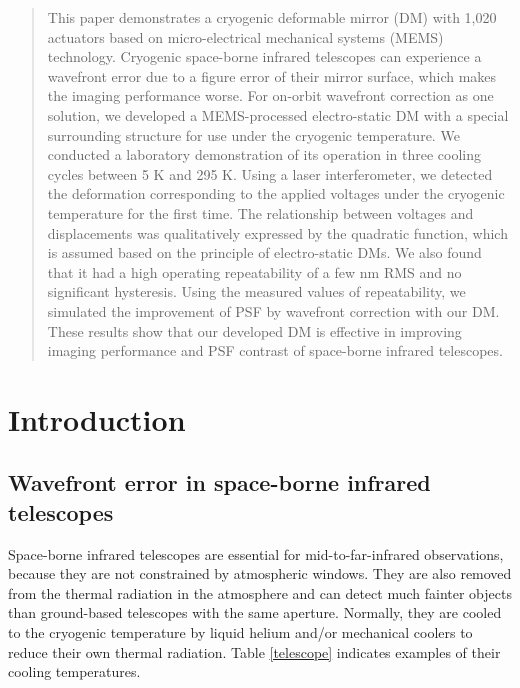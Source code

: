 \documentclass[a4paper]{article}
\begin{document}
\begin{titlepage}

\begin{abstract}

This paper demonstrates a cryogenic deformable mirror (DM) with 1,020 actuators based on micro-electrical mechanical systems (MEMS) technology. Cryogenic space-borne infrared telescopes can experience a wavefront error due to a figure error of their mirror surface, which makes the imaging performance worse. 
For on-orbit wavefront correction as one solution, we developed a MEMS-processed electro-static DM with a special surrounding structure for use under the cryogenic temperature. We conducted a laboratory demonstration of its operation in three cooling cycles between 5 K and 295 K. Using a laser interferometer, we detected the deformation corresponding to the applied voltages under the cryogenic temperature for the first time. The relationship between voltages and displacements was qualitatively expressed by the quadratic function, which is assumed based on the principle of electro-static DMs. We also found that it had a high operating repeatability of a few nm RMS and no significant hysteresis. 
Using the measured values of repeatability, we simulated the improvement of PSF by wavefront correction with our DM. These results show that our developed DM is effective in improving imaging performance and PSF contrast of space-borne infrared telescopes.
\end{abstract}
\end{titlepage}

\maketitle


\section{Introduction}

\subsection{Wavefront error in space-borne infrared telescopes}
Space-borne infrared telescopes are essential for mid-to-far-infrared observations, because they are not constrained by atmospheric windows. They are also removed from the thermal radiation in the atmosphere and can detect much fainter objects than ground-based telescopes with the same aperture. Normally, they are cooled to the cryogenic temperature by liquid helium and/or mechanical coolers to reduce their own thermal radiation. Table \ref{telescope} indicates examples of their cooling temperatures.
\end{document}
